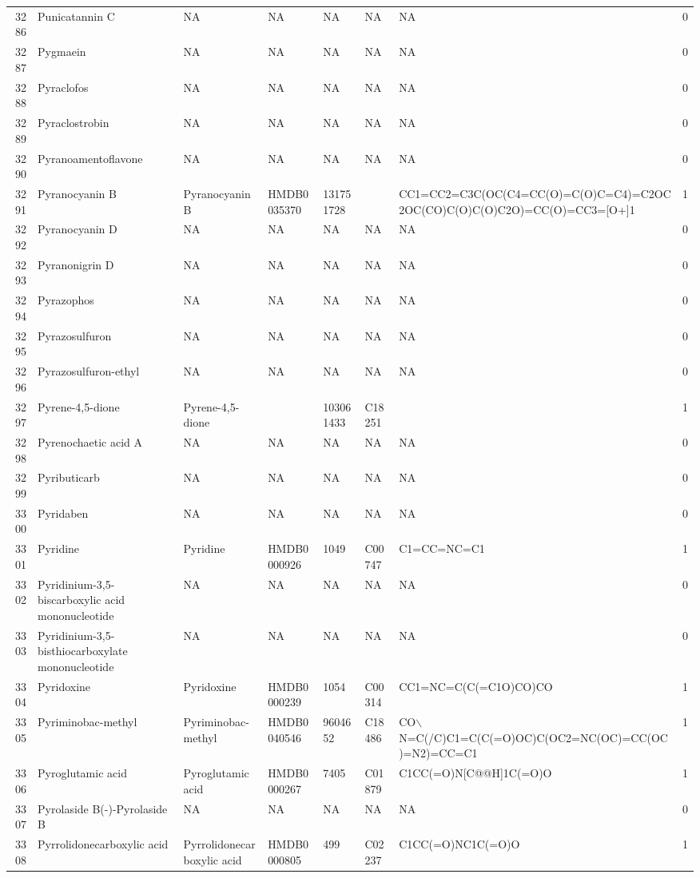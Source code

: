 \documentclass[a4paper]{article}
\begin{document}
\begin{longtable}{rlllllll}
  3286 & Punicatannin C & NA & NA & NA & NA & NA & 0 \\ 
  3287 & Pygmaein & NA & NA & NA & NA & NA & 0 \\ 
  3288 & Pyraclofos & NA & NA & NA & NA & NA & 0 \\ 
  3289 & Pyraclostrobin & NA & NA & NA & NA & NA & 0 \\ 
  3290 & Pyranoamentoflavone & NA & NA & NA & NA & NA & 0 \\ 
  3291 & Pyranocyanin B & Pyranocyanin B & HMDB0035370 & 131751728 &  & CC1=CC2=C3C(OC(C4=CC(O)=C(O)C=C4)=C2OC2OC(CO)C(O)C(O)C2O)=CC(O)=CC3=[O+]1 & 1 \\ 
  3292 & Pyranocyanin D & NA & NA & NA & NA & NA & 0 \\ 
  3293 & Pyranonigrin D & NA & NA & NA & NA & NA & 0 \\ 
  3294 & Pyrazophos & NA & NA & NA & NA & NA & 0 \\ 
  3295 & Pyrazosulfuron & NA & NA & NA & NA & NA & 0 \\ 
  3296 & Pyrazosulfuron-ethyl & NA & NA & NA & NA & NA & 0 \\ 
  3297 & Pyrene-4,5-dione & Pyrene-4,5-dione &  & 103061433 & C18251 &  & 1 \\ 
  3298 & Pyrenochaetic acid A & NA & NA & NA & NA & NA & 0 \\ 
  3299 & Pyributicarb & NA & NA & NA & NA & NA & 0 \\ 
  3300 & Pyridaben & NA & NA & NA & NA & NA & 0 \\ 
  3301 & Pyridine & Pyridine & HMDB0000926 & 1049 & C00747 & C1=CC=NC=C1 & 1 \\ 
  3302 & Pyridinium-3,5-biscarboxylic acid mononucleotide & NA & NA & NA & NA & NA & 0 \\ 
  3303 & Pyridinium-3,5-bisthiocarboxylate mononucleotide & NA & NA & NA & NA & NA & 0 \\ 
  3304 & Pyridoxine & Pyridoxine & HMDB0000239 & 1054 & C00314 & CC1=NC=C(C(=C1O)CO)CO & 1 \\ 
  3305 & Pyriminobac-methyl & Pyriminobac-methyl & HMDB0040546 & 9604652 & C18486 & CO$\backslash$N=C(/C)C1=C(C(=O)OC)C(OC2=NC(OC)=CC(OC)=N2)=CC=C1 & 1 \\ 
  3306 & Pyroglutamic acid & Pyroglutamic acid & HMDB0000267 & 7405 & C01879 & C1CC(=O)N[C@@H]1C(=O)O & 1 \\ 
  3307 & Pyrolaside B(-)-Pyrolaside B & NA & NA & NA & NA & NA & 0 \\ 
  3308 & Pyrrolidonecarboxylic acid & Pyrrolidonecarboxylic acid & HMDB0000805 & 499 & C02237 & C1CC(=O)NC1C(=O)O & 1 \\ 

\end{longtable}
\end{document}
